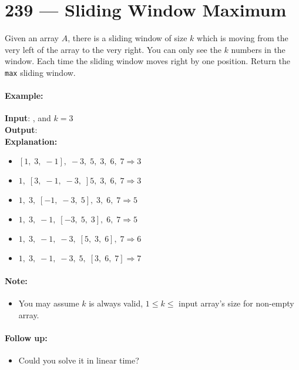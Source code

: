 \section{239 --- Sliding Window Maximum}
Given an array $A$, there is a sliding window of size $k$ which is moving from the very left of the array to the very right. You can only see the $k$ numbers in the window. Each time the sliding window moves right by one position. Return the \texttt{max} sliding window.

\paragraph{Example:}
\begin{flushleft}
\textbf{Input}: , and $k = 3$
\\
\textbf{Output}: \fcj{[3,3,5,5,6,7]}
\\
\textbf{Explanation:} 
\begin{itemize}
\item $[1,\;  3,\;  -1],\; -3,\;  5,\;  3,\;  6,\;  7 \Longrightarrow       3$
\item $1,\; [3,\;  -1,\;  -3,\;] 5,\;  3,\;  6,\;  7 \Longrightarrow       3$
\item $1,\;  3,\; [-1,\;  -3,\;  5],\; 3,\;  6,\;  7 \Longrightarrow 5$
\item $1,\; 3,\; -1,\;[-3,\; 5,\; 3],\; 6,\; 7 \Longrightarrow 5$
\item $1,\;  3,\;  -1,\;  -3,\; [5,\;  3,\;  6],\; 7 \Longrightarrow       6$
\item $1,\; 3,\; -1,\;  -3,\;  5,\; [3,\;  6,\;  7]  \Longrightarrow  7$
\end{itemize}
\end{flushleft}
\paragraph{Note:}
\begin{itemize}
\item You may assume $k$ is always valid, $1 \leq k \leq$ input array's size for non-empty array.
\end{itemize}
\paragraph{Follow up:}
\begin{itemize}
\item Could you solve it in linear time?
\end{itemize}
